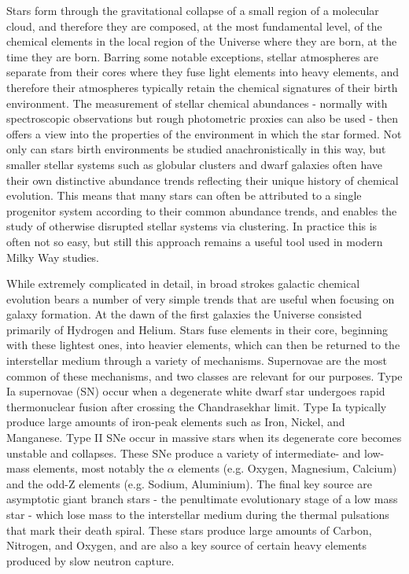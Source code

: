 Stars form through the gravitational collapse of a small region of a molecular cloud, and therefore they are composed, at the most fundamental level, of the chemical elements in the local region of the Universe where they are born, at the time they are born. Barring some notable exceptions, stellar atmospheres are separate from their cores where they fuse light elements into heavy elements, and therefore their atmospheres typically retain the chemical signatures of their birth environment. The measurement of stellar chemical abundances - normally with spectroscopic observations but rough photometric proxies can also be used - then offers a view into the properties of the environment in which the star formed. Not only can stars birth environments be studied anachronistically in this way, but smaller stellar systems such as globular clusters and dwarf galaxies often have their own distinctive abundance trends reflecting their unique history of chemical evolution. This means that many stars can often be attributed to a single progenitor system according to their common abundance trends, and enables the study of otherwise disrupted stellar systems via clustering. In practice this is often not so easy, but still this approach remains a useful tool used in modern Milky Way studies.

While extremely complicated in detail, in broad strokes galactic chemical evolution bears a number of very simple trends that are useful when focusing on galaxy formation. At the dawn of the first galaxies the Universe consisted primarily of Hydrogen and Helium. Stars fuse elements in their core, beginning with these lightest ones, into heavier elements, which can then be returned to the interstellar medium through a variety of mechanisms. Supernovae are the most common of these mechanisms, and two classes are relevant for our purposes. Type Ia supernovae (SN) occur when a degenerate white dwarf star undergoes rapid thermonuclear fusion after crossing the Chandrasekhar limit. Type Ia typically produce large amounts of iron-peak elements such as Iron, Nickel, and Manganese. Type II SNe occur in massive stars when its degenerate core becomes unstable and collapses. These SNe produce a variety of intermediate- and low-mass elements, most notably the $\alpha$ elements (e.g. Oxygen, Magnesium, Calcium) and the odd-Z elements (e.g. Sodium, Aluminium). The final key source are asymptotic giant branch stars - the penultimate evolutionary stage of a low mass star - which lose mass to the interstellar medium during the thermal pulsations that mark their death spiral. These stars produce large amounts of Carbon, Nitrogen, and Oxygen, and are also a key source of certain heavy elements produced by slow neutron capture.

